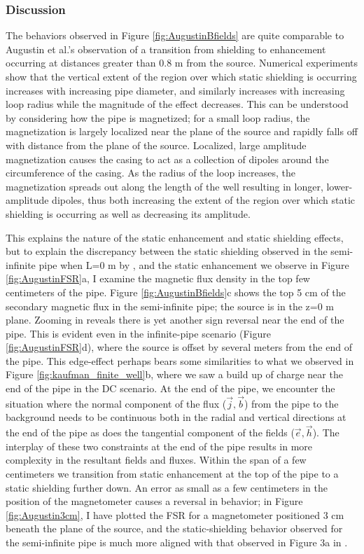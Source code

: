\subsubsection{Discussion}
The behaviors observed in Figure \ref{fig:AugustinBfields} are quite comparable to Augustin et al.'s observation of a transition from shielding to enhancement occurring at distances greater than 0.8 m from the source. Numerical experiments show that the vertical extent of the region over which static shielding is occurring increases with increasing pipe diameter, and similarly increases with increasing loop radius while the magnitude of the effect decreases. This can be understood by considering how the pipe is magnetized; for a small loop radius, the magnetization is largely localized near the plane of the source and rapidly falls off with distance from the plane of the source. Localized, large amplitude magnetization causes the casing to act as a collection of dipoles around the circumference of the casing. As the radius of the loop increases, the magnetization spreads out along the length of the well resulting in longer, lower-amplitude dipoles, thus both increasing the extent of the region over which static shielding is occurring as well as decreasing its amplitude.




This explains the nature of the static enhancement and static shielding effects, but to explain the discrepancy between the static shielding observed in the semi-infinite pipe when L=0 m by \cite{Augustin1989}, and the static enhancement we observe in Figure \ref{fig:AugustinFSR}a, I examine the magnetic flux density in the top few centimeters of the pipe. Figure \ref{fig:AugustinBfields}c shows the top 5 cm of the secondary magnetic flux in the semi-infinite pipe; the source is in the z=0 m plane.  Zooming in reveals there is yet another sign reversal near the end of the pipe. This is evident even in the infinite-pipe scenario (Figure \ref{fig:AugustinFSR}d), where the source is offset by several meters from the end of the pipe. This edge-effect perhaps bears some similarities to what we observed in Figure \ref{fig:kaufman_finite_well}b, where we saw a build up of charge near the end of the pipe in the DC scenario. At the end of the pipe, we encounter the situation where the normal component of the flux ($\vec{j}, \vec{b}$) from the pipe to the background needs to be continuous both in the radial and vertical directions at the end of the pipe as does the tangential component of the fields ($\vec{e}, \vec{h}$). The interplay of these two constraints at the end of the pipe results in more complexity in the resultant fields and fluxes. Within the span of a few centimeters we transition from static enhancement at the top of the pipe to a static shielding further down. An error as small as a few centimeters in the position of the magnetometer causes a reversal in behavior; in Figure \ref{fig:Augustin3cm}, I have plotted the FSR for a magnetometer positioned 3 cm beneath the plane of the source, and the static-shielding behavior observed for the semi-infinite pipe is much more aligned with that observed in Figure 3a in \cite{Augustin1989}.



